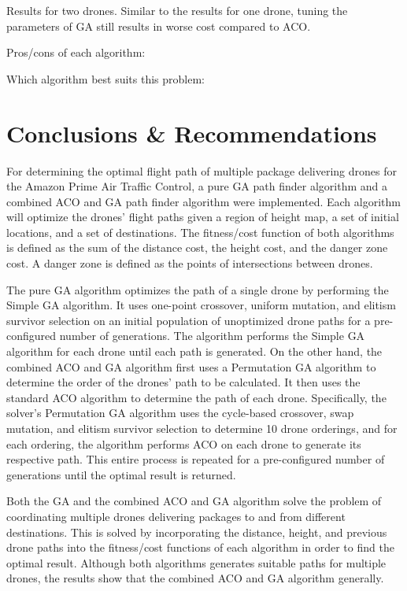 \documentclass[conference]{IEEEtran}
\begin{document}
Results for two drones. Similar to the results for one drone, tuning the parameters of GA still results in worse cost compared to ACO. 

Pros/cons of each algorithm:  

Which algorithm best suits this problem:

\section{Conclusions \& Recommendations}
For determining the optimal flight path of multiple package delivering drones for the Amazon Prime Air Traffic Control, a pure GA path finder algorithm and a combined ACO and GA path finder algorithm were implemented. Each algorithm will optimize the drones' flight paths given a region of height map, a set of initial locations, and a set of destinations. The fitness/cost function of both algorithms is defined as the sum of the distance cost, the height cost, and the danger zone cost. A danger zone is defined as the points of intersections between drones.

The pure GA algorithm optimizes the path of a single drone by performing the Simple GA algorithm. It uses one-point crossover, uniform mutation, and elitism survivor selection on an initial population of unoptimized drone paths for a pre-configured number of generations. The algorithm performs the Simple GA algorithm for each drone until each path is generated. On the other hand, the combined ACO and GA algorithm first uses a Permutation GA algorithm to determine the order of the drones' path to be calculated. It then uses the standard ACO algorithm to determine the path of each drone. Specifically, the solver's Permutation GA algorithm uses the cycle-based crossover, swap mutation, and elitism survivor selection to determine 10 drone orderings, and for each ordering, the algorithm performs ACO on each drone to generate its respective path. This entire process is repeated for a pre-configured number of generations until the optimal result is returned.

Both the GA and the combined ACO and GA algorithm solve the problem of coordinating multiple drones delivering packages to and from different destinations. This is solved by incorporating the distance, height, and previous drone paths into the fitness/cost functions of each algorithm in order to find the optimal result. Although both algorithms generates suitable paths for multiple drones, the results show that the combined ACO and GA algorithm generally.
\end{document}
